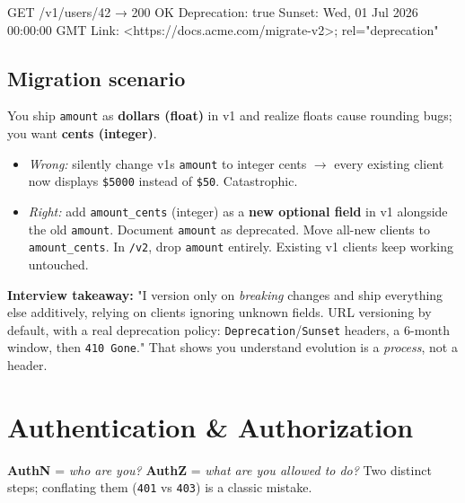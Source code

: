 \documentclass[11pt]{article}
\providecommand{\tightlist}{\setlength{\itemsep}{1pt}\setlength{\parskip}{0pt}}
\newenvironment{Shaded}{\begin{snugshade}}{\end{snugshade}}
\newcommand{\NormalTok}[1]{\textcolor[rgb]{0.81,0.81,0.76}{#1}}
\begin{document}

\begin{Shaded}
\begin{Highlighting}[]
\NormalTok{GET /v1/users/42}
\NormalTok{→ 200 OK}
\NormalTok{  Deprecation: true}
\NormalTok{  Sunset: Wed, 01 Jul 2026 00:00:00 GMT}
\NormalTok{  Link: \textless{}https://docs.acme.com/migrate{-}v2\textgreater{}; rel="deprecation"}
\end{Highlighting}
\end{Shaded}

\subsection{Migration scenario}\label{migration-scenario}

You ship \texttt{amount} as \textbf{dollars (float)} in v1 and realize floats cause rounding bugs; you want \textbf{cents (integer)}.

\begin{itemize}
\tightlist
\item
  \emph{Wrong:} silently change v1\textquotesingle s \texttt{amount} to integer cents \(\rightarrow\) every existing client now displays \texttt{\$5000} instead of \texttt{\$50}. Catastrophic.
\item
  \emph{Right:} add \texttt{amount\_cents} (integer) as a \textbf{new optional field} in v1 alongside the old \texttt{amount}. Document \texttt{amount} as deprecated. Move all-new clients to \texttt{amount\_cents}. In \texttt{/v2}, drop \texttt{amount} entirely. Existing v1 clients keep working untouched.
\end{itemize}

\textbf{Interview takeaway:} "I version only on \emph{breaking} changes and ship everything else additively, relying on clients ignoring unknown fields. URL versioning by default, with a real deprecation policy: \texttt{Deprecation}/\texttt{Sunset} headers, a 6-month window, then \texttt{410\ Gone}." That shows you understand evolution is a \emph{process}, not a header.

\section{Authentication \& Authorization}\label{authentication--authorization}

\textbf{AuthN} = \emph{who are you?} \textbf{AuthZ} = \emph{what are you allowed to do?} Two distinct steps; conflating them (\texttt{401} vs \texttt{403}) is a classic mistake.
\end{document}
